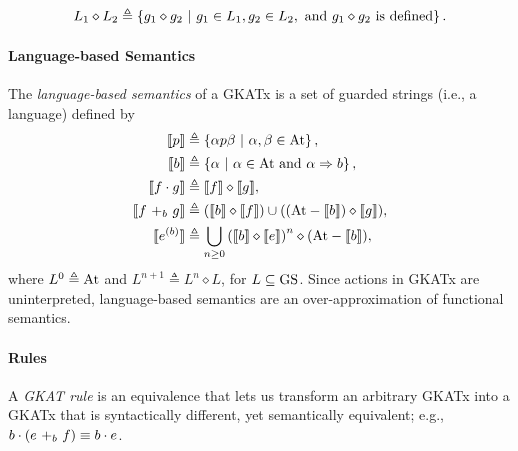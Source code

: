 \begin{align*}
    L_1\diamond L_2 \triangleq \set{g_1\diamond g_2\ |\ g_1\in L_1,g_2\in L_2,\text{ and $g_1\diamond g_2$ is defined}}.
\end{align*}
\paragraph*{Language-based Semantics}
The \emph{language-based semantics} of a GKATx is a {set of guarded strings} (i.e., a language) defined by%
\begin{align*}
\semantics{p} &\triangleq \set{\alpha p \beta\ |\ \alpha,\beta\in \Atom},\\
%
\semantics{b} &\triangleq  \set{\alpha\ |\ \alpha\in \Atom \text{ and }\alpha \Rightarrow b},\\
%
\semantics{f\cdot g} &\triangleq \semantics{f}\diamond\semantics{g},\\
%
%
\semantics{\branch{b}{f}{g}} &\triangleq (\semantics{b}\diamond\semantics{f})\cup ((\Atom-\semantics{b})\diamond \semantics{g}),\\
%
%
\semantics{ \iteration{b}{e}} &\triangleq  \bigcup_{n\geq 0}\left(\semantics{b}\diamond\semantics{e}\right)^{n}\diamond (\Atom-\semantics{b}),
%
%
\end{align*}
where $L^0\triangleq\Atom$ and $L^{n+1}\triangleq L^{n} \diamond L$, for $L \subseteq \GuardedString$. Since actions in GKATx are uninterpreted, language-based semantics are an over-approximation of functional semantics. %
\paragraph*{Rules}
A \emph{GKAT rule} is an equivalence that lets us transform an arbitrary GKATx into a GKATx that is syntactically different, yet semantically equivalent; e.g., $b\cdot\left(\branch{b}{e}{f} \right) \equiv b\cdot e$.

